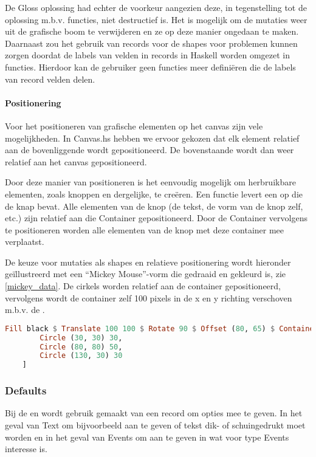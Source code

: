 De Gloss oplossing had echter de voorkeur aangezien deze, in tegenstelling tot de oplossing m.b.v. functies, niet destructief is. Het is mogelijk om de mutaties weer uit de grafische boom te verwijderen en ze op deze manier ongedaan te maken. Daarnaast zou het gebruik van records voor de shapes voor problemen kunnen zorgen doordat de labels van velden in records in Haskell worden omgezet in functies. Hierdoor kan de gebruiker geen functies meer defini\"eren die de labels van record velden delen.

\paragraph{Positionering}
Voor het positioneren van grafische elementen op het canvas zijn vele mogelijkheden. In Canvas.hs hebben we ervoor gekozen dat elk element relatief aan de bovenliggende  wordt gepositioneerd. De bovenstaande  wordt dan weer relatief aan het canvas gepositioneerd. 

Door deze manier van positioneren is het eenvoudig mogelijk om herbruikbare elementen, zoals knoppen en dergelijke, te creëren. Een functie levert een  op die de knap bevat. Alle elementen van de knop (de tekst, de vorm van de knop zelf, etc.) zijn relatief aan die Container gepositioneerd. Door de Container vervolgens te positioneren worden alle elementen van de knop met deze container mee verplaatst. 

De keuze voor mutaties als shapes en relatieve positionering wordt hieronder geïllustreerd met een ``Mickey Mouse''-vorm die gedraaid en gekleurd is, zie \autoref{mickey_data}. De cirkels worden relatief aan de container gepositioneerd, vervolgens wordt de container zelf 100 pixels in de x en y richting verschoven m.b.v. de . 

\begin{lstlisting}[style=densecode, language=Haskell, caption=Mickey-figuur volgens het Canvas.hs gegevensmodel, label=mickey_data]
Fill black $ Translate 100 100 $ Rotate 90 $ Offset (80, 65) $ Container 160 130 [
        Circle (30, 30) 30,
        Circle (80, 80) 50,
        Circle (130, 30) 30
    ]
\end{lstlisting}

\subsubsection{Defaults}
Bij de  en  wordt gebruik gemaakt van een record om opties mee te geven. In het geval van Text om bijvoorbeeld aan te geven of tekst dik- of schuingedrukt moet worden en in het geval van Events om aan te geven in wat voor type Events interesse is. 

